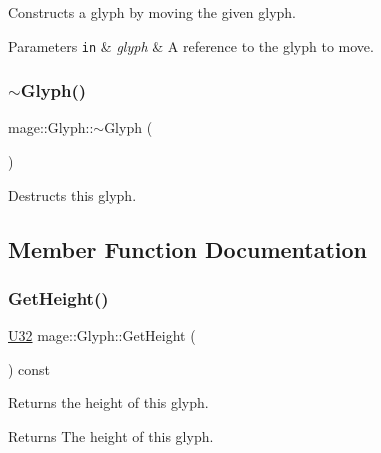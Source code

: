 Constructs a glyph by moving the given glyph.


\begin{DoxyParams}[1]{Parameters}
\mbox{\tt in}  & {\em glyph} & A reference to the glyph to move. \\
\hline
\end{DoxyParams}
\hypertarget{structmage_1_1_glyph_aa8e903334e77cc2930149923461d06ab}{}\label{structmage_1_1_glyph_aa8e903334e77cc2930149923461d06ab} 
\subsubsection{\texorpdfstring{$\sim$\+Glyph()}{~Glyph()}}
{\footnotesize\ttfamily mage\+::\+Glyph\+::$\sim$\+Glyph (\begin{DoxyParamCaption}{ }\end{DoxyParamCaption})\hspace{0.3cm}{\ttfamily [default]}}

Destructs this glyph. 

\subsection{Member Function Documentation}
\hypertarget{structmage_1_1_glyph_a05deaaf61096d41cda1d85ef0488b36e}{}\label{structmage_1_1_glyph_a05deaaf61096d41cda1d85ef0488b36e} 
\subsubsection{\texorpdfstring{Get\+Height()}{GetHeight()}}
{\footnotesize\ttfamily \hyperlink{namespacemage_a41c104c036fba3756a74e19f793eeaa1}{U32} mage\+::\+Glyph\+::\+Get\+Height (\begin{DoxyParamCaption}{ }\end{DoxyParamCaption}) const\hspace{0.3cm}{\ttfamily [noexcept]}}

Returns the height of this glyph.

\begin{DoxyReturn}{Returns}
The height of this glyph. 
\end{DoxyReturn}
\hypertarget{structmage_1_1_glyph_a672de806086fa9f23832d9f8e617fc3f}{}\label{structmage_1_1_glyph_a672de806086fa9f23832d9f8e617fc3f} 
